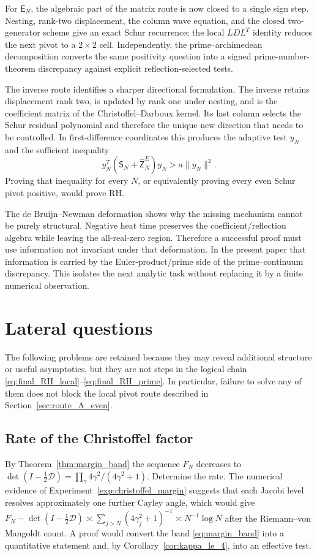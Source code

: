 \documentclass[11pt]{amsart}
\numberwithin{equation}{section}
\theoremstyle{plain}
\theoremstyle{definition}
\theoremstyle{remark}
\newcommand{\E}{\mathsf E}
\begin{document}
For \(\E_N\), the algebraic part of the matrix route is now closed to a single sign step.  Nesting,
rank-two displacement, the column wave equation, and the closed two-generator scheme give an exact
Schur recurrence; the local \(LDL^T\) identity reduces the next pivot to a \(2\times2\) cell.
Independently, the prime--archimedean decomposition converts the same positivity question into a
signed prime-number-theorem discrepancy against explicit reflection-selected tests.

The inverse route identifies a sharper directional formulation.  The inverse retains displacement
rank two, is updated by rank one under nesting, and is the coefficient matrix of the
Christoffel--Darboux kernel.  Its last column selects the Schur residual polynomial and therefore
the unique new direction that needs to be controlled.  In first-difference coordinates this
produces the adaptive test \(y_N\) and the sufficient inequality
\[
y_N^T(\mathsf S_N+\widehat{\mathsf Z}_N^E)y_N>a\|y_N\|^2.
\]
Proving that inequality for every \(N\), or equivalently proving every even Schur pivot positive,
would prove RH.

The de Bruijn--Newman deformation shows why the missing mechanism cannot be purely structural.
Negative heat time preserves the coefficient/reflection algebra while leaving the all-real-zero
region.  Therefore a successful proof must use information not invariant under that deformation.
In the present paper that information is carried by the Euler-product/prime side of the
prime--continuum discrepancy.  This isolates the next analytic task without replacing it by a
finite numerical observation.

\appendix
\section{Lateral questions}
\label{sec:lateral_questions}

The following problems are retained because they may reveal additional structure or useful
asymptotics, but they are not steps in the logical chain \eqref{eq:final_RH_local}--\eqref{eq:final_RH_prime}.  In
particular, failure to solve any of them does not block the local pivot route described in
Section~\ref{sec:route_A_even}.

\subsection{Rate of the Christoffel factor}
\label{ques:F_rate}
By Theorem~\ref{thm:margin_band} the sequence $F_N$ decreases to
$\det(I-\tfrac12\mathcal D)=\prod_\gamma 4\gamma^2/(4\gamma^2+1)$.  Determine the rate.
The numerical evidence of Experiment~\ref{exp:christoffel_margin} suggests that each
Jacobi level resolves approximately one further Cayley angle, which would give
$F_N-\det(I-\tfrac12\mathcal D)\asymp\sum_{j>N}(4\gamma_j^2+1)^{-1}\asymp N^{-1}\log N$
after the Riemann--von Mangoldt count.  A proof would convert the band
\eqref{eq:margin_band} into a quantitative statement and, by
Corollary~\ref{cor:kappa_le_4}, into an effective test.
\end{document}
